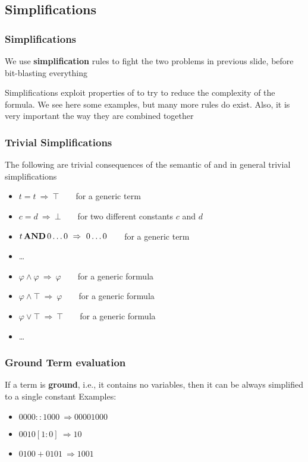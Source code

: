 \subsection{Simplifications}

\begin{frame}
  \frametitle{Simplifications}

  \scriptsize

  We use {\bf simplification} rules to fight the two problems in previous slide,
  before bit-blasting everything
  \vfill
  \pause
  \begin{center}
  \scalebox{.4}{}
  \end{center}
  \vfill
  \pause
  Simplifications exploit properties of \bitvectors to try to reduce
  the complexity of the formula. We see here some examples, but many
  more rules do exist. Also, it is very important the way they are
  combined together 

\end{frame}

\begin{frame}
  \frametitle{Trivial Simplifications}

  The following are trivial consequences of the semantic of \bitvectors and
  \formulae in general
  \vfill
  \pause
  \bitvectors trivial simplifications
  \begin{itemize}
    \item $t = t\ \Rightarrow\ \top$\ \ \ \ for a generic term
    \item $c = d\ \Rightarrow\ \bot$\ \ \ \ for two different constants $c$ and $d$
    \item $t \band 0\ldots0\ \Rightarrow\ 0\ldots0$\ \ \ \ for a generic term
    \item \ldots
  \end{itemize}
  \vfill
  \pause
  \begin{itemize}
    \item $\varphi \wedge \varphi\ \Rightarrow\ \varphi$\ \ \ \ for a generic formula
    \item $\varphi \wedge \top\ \Rightarrow\ \varphi$\ \ \ \ for a generic formula
    \item $\varphi \vee \top\ \Rightarrow\ \top$\ \ \ \ for a generic formula
    \item \ldots
  \end{itemize}

\end{frame}

\begin{frame}
  \frametitle{Ground Term evaluation}
  
  If a term is {\bf ground}, i.e., it contains no variables, then it
  can be always simplified to a single constant
  \vfill
  \pause
  Examples:
  \begin{itemize}
    \item $0000 :: 1000\ \Rightarrow 00001000$
    \item $0010[1:0]\ \Rightarrow 10$
    \item $0100 + 0101\ \Rightarrow 1001$
  \end{itemize}

\end{frame}


